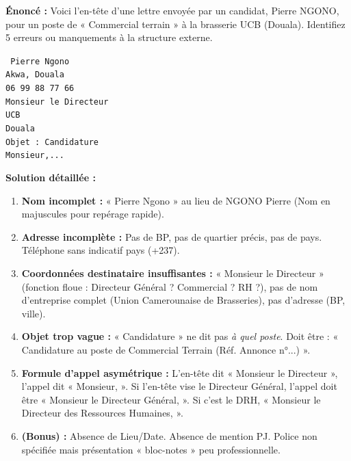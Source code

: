 \documentclass[11pt]{article}
\begin{document}
\begin{exoresolu}
\textbf{Énoncé :} Voici l'en-tête d'une lettre envoyée par un candidat, Pierre \textsc{NGONO}, pour un poste de « Commercial terrain » à la brasserie \textsc{UCB} (Douala). Identifiez 5 erreurs ou manquements à la structure externe.

\begin{flushleft}
\texttt{\small
Pierre Ngono\\
Akwa, Douala\\
06 99 88 77 66
\\
Monsieur le Directeur\\
UCB\\
Douala
\\
Objet : Candidature
\\
Monsieur,...
}
\end{flushleft}

\textbf{Solution détaillée :}
\begin{enumerate}
    \item \textbf{Nom incomplet :} « Pierre Ngono » au lieu de \textsc{NGONO} Pierre (Nom en majuscules pour repérage rapide).
    \item \textbf{Adresse incomplète :} Pas de BP, pas de quartier précis, pas de pays. Téléphone sans indicatif pays (+237).
    \item \textbf{Coordonnées destinataire insuffisantes :} « Monsieur le Directeur » (fonction floue : Directeur Général ? Commercial ? RH ?), pas de nom d'entreprise complet (Union Camerounaise de Brasseries), pas d'adresse (BP, ville).
    \item \textbf{Objet trop vague :} « Candidature » ne dit pas \emph{à quel poste}. Doit être : « Candidature au poste de Commercial Terrain (Réf. Annonce n°...) ».
    \item \textbf{Formule d'appel asymétrique :} L'en-tête dit « Monsieur le Directeur », l'appel dit « Monsieur, ». Si l'en-tête vise le Directeur Général, l'appel doit être « Monsieur le Directeur Général, ». Si c'est le DRH, « Monsieur le Directeur des Ressources Humaines, ».
    \item \textbf{(Bonus) :} Absence de Lieu/Date. Absence de mention PJ. Police non spécifiée mais présentation « bloc-notes » peu professionnelle.
\end{enumerate}
\end{exoresolu}
\end{document}
